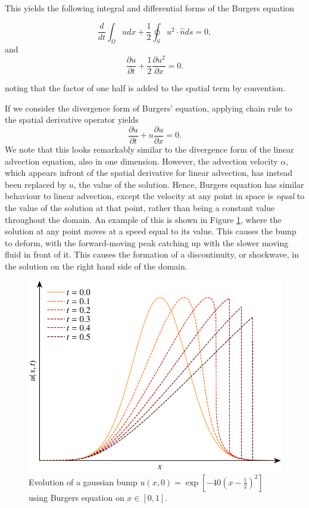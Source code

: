 This yields the following integral and differential forms of the Burgers equation
\begin{eqBox}
\begin{equation}
	 \frac{d}{dt}\int_\Omega u dx + \frac{1}{2}\oint_S u^2 \cdot \hat{n} ds =  0,
\end{equation}
and
\begin{equation}
	\frac{\partial u}{\partial t} +  \frac{1}{2} \frac{\partial u^2}{\partial x} = 0.
\end{equation}
\end{eqBox}
noting that the factor of one half is added to the spatial term by convention.

If we consider the divergence form of Burgers' equation, applying chain rule to the spatial derivative operator yields
\begin{equation}
	\frac{\partial u}{\partial t} +  u \frac{\partial u}{\partial x} = 0.
\end{equation}
We note that this looks remarkably similar to the divergence form of the linear advection equation, also in one dimension. However, the advection velocity $\alpha$, which appears infront of the spatial derivative for linear advection, has instead been replaced by $u$, the value of the solution. Hence, Burgers equation has similar behaviour to linear advection, except the velocity at any point in space is {\it equal} to the value of the solution at that point, rather than being a constant value throughout the domain. An example of this is shown in Figure \ref{fig:burgers_equation}, where the solution at any point moves at a speed equal to its value. This causes the bump to deform, with the forward-moving peak catching up with the slower moving fluid in front of it. This causes the formation of a discontinuity, or shockwave, in the solution on the right hand side of the domain.
\begin{figure}[htbp]
	\centering
	\includegraphics[width=0.65\linewidth]{Pictures/burgers_equation}
	\caption{Evolution of a gaussian bump $u(x,0)=\exp\left[-40\left(x-\frac{1}{2}\right)^2\right]$ using Burgers equation on $x\in[0,1]$.}
	\label{fig:burgers_equation}
\end{figure}
